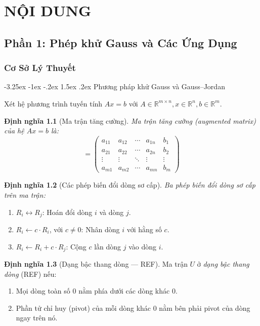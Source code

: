\documentclass[12pt]{article}
\makeatletter
\newcommand\subsubsubsection{\@startsection{paragraph}{4}{\z@}%
    {-3.25ex \@plus -1ex \@minus -.2ex}%
    {1.5ex \@plus .2ex}%
    {\normalfont\normalsize\bfseries}}
\makeatother
\begin{document}
\section{NỘI DUNG}

\subsection{Phần 1: Phép khử Gauss và Các Ứng Dụng}
\subsubsection{Cơ Sở Lý Thuyết}

\subsubsubsection{Phương pháp khử Gauss và Gauss--Jordan}

Xét hệ phương trình tuyến tính $Ax = b$ với $A \in \mathbb{R}^{m \times n}, x \in \mathbb{R}^n, b \in \mathbb{R}^m$.

\textbf{Định nghĩa 1.1} (Ma trận tăng cường). \textit{Ma trận tăng cường (augmented matrix) của hệ $Ax = b$ là:}
\begin{equation}
[A \mid b] = 
\left(
\begin{array}{cccc|c}
a_{11} & a_{12} & \cdots & a_{1n} & b_1 \\
a_{21} & a_{22} & \cdots & a_{2n} & b_2 \\
\vdots & \vdots & \ddots & \vdots & \vdots \\
a_{m1} & a_{m2} & \cdots & a_{mn} & b_m
\end{array}
\right)
\end{equation}

\textbf{Định nghĩa 1.2} (Các phép biến đổi dòng sơ cấp). \textit{Ba phép biến đổi dòng sơ cấp trên ma trận:}
\begin{enumerate}
    \item $R_i \leftrightarrow R_j$: Hoán đổi dòng $i$ và dòng $j$.
    \item $R_i \leftarrow c \cdot R_i$, với $c \neq 0$: Nhân dòng $i$ với hằng số $c$.
    \item $R_i \leftarrow R_i + c \cdot R_j$: Cộng $c$ lần dòng $j$ vào dòng $i$.
\end{enumerate}

\textbf{Định nghĩa 1.3} (Dạng bậc thang dòng --- REF). Ma trận $U$ ở \textit{dạng bậc thang dòng} (REF) nếu:
\begin{enumerate}
    \item Mọi dòng toàn số 0 nằm phía dưới các dòng khác 0.
    \item Phần tử chỉ huy (pivot) của mỗi dòng khác 0 nằm bên phải pivot của dòng ngay trên nó.
\end{enumerate}
\end{document}
